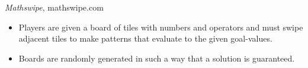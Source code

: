 {\sl Mathswipe}, mathswipe.com
\begin{itemize} \itemsep -2pt %
\item Players are given a board of tiles with numbers and operators and must swipe adjacent tiles to make patterns that evaluate to the given goal-values.
\item Boards are randomly generated in such a way that a solution is guaranteed.
\end{itemize}
